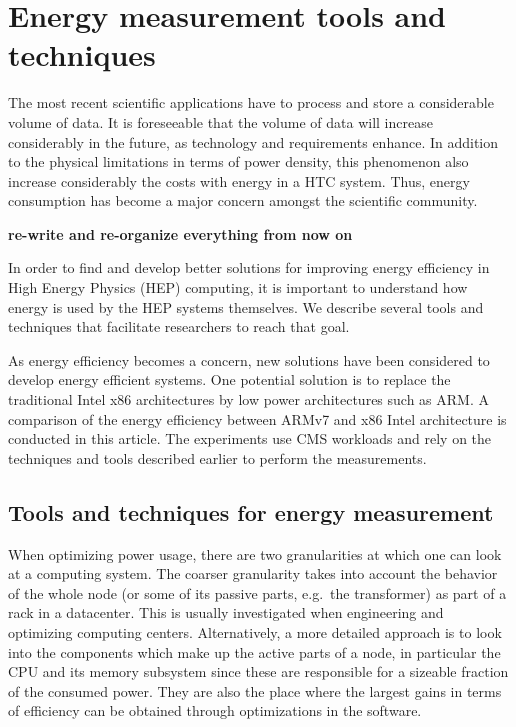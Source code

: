 \chapter{Energy measurement tools and techniques}


The most recent scientific applications have to process and store
a considerable volume of data. It is foreseeable that the volume of
data will increase considerably in the future, as technology and
requirements enhance. In addition to the physical limitations in
terms of power density, this phenomenon also increase considerably
the costs with energy in a HTC system. Thus, energy consumption has
become a major concern amongst the scientific community.



\textbf{re-write and re-organize everything from now on}

In order to find and develop better solutions for improving energy
efficiency in High Energy Physics (HEP) computing, it is important to understand
how energy is used by the HEP systems themselves. We describe several
tools and techniques that facilitate researchers to reach that goal.

As energy efficiency becomes a concern, new solutions have been
considered to develop energy efficient systems. One potential
solution is to replace the traditional Intel x86 architectures by
low power architectures such as ARM. A comparison of the energy
efficiency between ARMv7 and x86 Intel architecture is conducted
in this article. The experiments use CMS workloads and rely on the
techniques and tools described earlier to perform the measurements.


\section{Tools and techniques for energy measurement}

When optimizing power usage, there are two granularities at which
one can look at a computing system. The coarser granularity
takes into account the behavior of the whole node (or
some of its passive parts, e.g.\ the transformer) as part of a rack
in a datacenter. This is usually investigated when
engineering and optimizing computing centers. Alternatively,
a more detailed approach is to
look into the components which make up the active parts of a
node, in particular the CPU and its memory subsystem since these
are responsible for a sizeable fraction of the consumed power.
They are also the place where the largest gains in terms of efficiency 
can be obtained through optimizations in the software.

